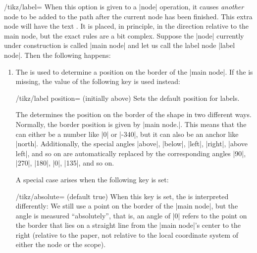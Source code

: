 \begin{key}{/tikz/label=}
        \label{label-option}%
    When this option is given to a |node| operation, it causes \emph{another}
    node to be added to the path after the current node has been finished. This
    extra node will have the text . It is placed, in principle, in
    the direction  relative to the main node, but the exact rules
    are a bit complex. Suppose the |node| currently under construction is
    called |main node| and let us call the label node |label node|. Then the
    following happens:
    \begin{enumerate}
        \item The  is used to determine a position on the border of
            the |main node|. If the  is missing, the value of the
            following key is used instead:
            \begin{key}{/tikz/label position= (initially above)}
                Sets the default position for labels.
            \end{key}
            The  determines the position on the border of the shape
            in two different ways. Normally, the border position is given by
            |main node.|. This means that the  can
            either be a number like |0| or |-340|, but it can also be an anchor
            like |north|. Additionally, the special angles |above|, |below|,
            |left|, |right|, |above left|, and so on are automatically replaced
            by the corresponding angles |90|, |270|, |180|, |0|, |135|, and so
            on.

            A special case arises when the following key is set:
            \begin{key}{/tikz/absolute= (default true)}
                When this key is set, the  is interpreted
                differently: We still use a point on the border of the
                |main node|, but the angle is measured ``absolutely'', that is,
                an angle of |0| refers to the point on the border that lies on
                a straight line from the |main node|'s center to the right
                (relative to the paper, not relative to the local coordinate
                system of either the node or the scope).


\end{key}
\end{enumerate}
\end{key}
